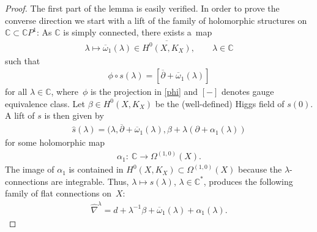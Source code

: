 \documentclass[11pt]{article}
\numberwithin{equation}{section}
\begin{document}
\begin{proof}
The f\/irst part of the lemma is easily verif\/ied. In order to prove the converse direction we start with a lift of the family of holomorphic structures on ${\mathbb C} \subset {\mathbb C}P^1$: As $\mathbb C$ is simply connected, there exists a~map
\begin{gather*}
\lambda \longmapsto \overline{\omega}_1(\lambda) \in \overline{H^0(X, K_X)} , \qquad \lambda \in \mathbb C\end{gather*}
such that \begin{gather*}\phi\circ s(\lambda) = [\overline{\partial}+\overline{\omega}_1(\lambda)]\end{gather*}
for all $\lambda \in {\mathbb C}$, where~$\phi$ is the projection in \eqref{phi} and $[-]$ denotes gauge equivalence class. Let $\beta \in H^0(X, K_X)$ be the (well-def\/ined) Higgs f\/ield of $s(0)$. A lift of $s$ is then given by
\begin{gather*}\widehat{s} (\lambda) = (\lambda,\overline{\partial}+\overline{\omega}_1(\lambda), \beta+\lambda(\partial+\alpha_1(\lambda))\end{gather*}
for some holomorphic map \begin{gather*}\alpha_1 \colon \ \mathbb C \longrightarrow \Omega^{(1,0)}(X) .\end{gather*} The image of $\alpha_1$ is contained in $H^0(X, K_X) \subset \Omega^{(1,0)}(X)$ because the $\lambda$-connections are integrable. Thus, $\lambda \longmapsto s(\lambda)$, $\lambda \in \mathbb C^*$, produces the following family of f\/lat connections on~$X$:
\begin{gather*}\widehat{\nabla}^\lambda = d+\lambda^{-1}\beta+\overline{\omega}_1(\lambda)+ \alpha_1(\lambda) .\end{gather*}


\end{proof}
\end{document}
